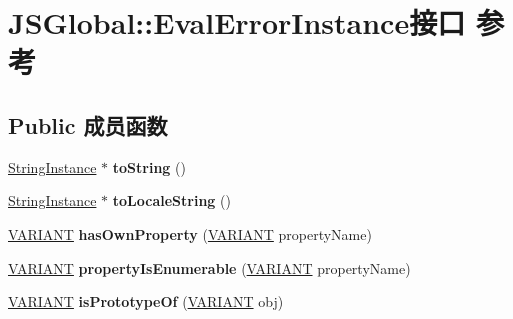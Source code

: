 \hypertarget{interface_j_s_global_1_1_eval_error_instance}{}\section{J\+S\+Global\+:\+:Eval\+Error\+Instance接口 参考}
\label{interface_j_s_global_1_1_eval_error_instance}
\subsection*{Public 成员函数}
\begin{DoxyCompactItemize}
\item 
\mbox{\label{interface_j_s_global_1_1_eval_error_instance_aa7875a9689d15f78c64ca5be8d114e8b}} 
\hyperlink{interface_j_s_global_1_1_string_instance}{String\+Instance} $\ast$ {\bfseries to\+String} ()
\item 
\mbox{\label{interface_j_s_global_1_1_eval_error_instance_ac48dba2354d92e16c06572089fcdeaf0}} 
\hyperlink{interface_j_s_global_1_1_string_instance}{String\+Instance} $\ast$ {\bfseries to\+Locale\+String} ()
\item 
\mbox{\label{interface_j_s_global_1_1_eval_error_instance_ad5681e088c045fc4a9699d256eded374}} 
\hyperlink{structtag_v_a_r_i_a_n_t}{V\+A\+R\+I\+A\+NT} {\bfseries has\+Own\+Property} (\hyperlink{structtag_v_a_r_i_a_n_t}{V\+A\+R\+I\+A\+NT} property\+Name)
\item 
\mbox{\label{interface_j_s_global_1_1_eval_error_instance_a0932f33609528a45f8633ed6a7a45dfc}} 
\hyperlink{structtag_v_a_r_i_a_n_t}{V\+A\+R\+I\+A\+NT} {\bfseries property\+Is\+Enumerable} (\hyperlink{structtag_v_a_r_i_a_n_t}{V\+A\+R\+I\+A\+NT} property\+Name)
\item 
\mbox{\label{interface_j_s_global_1_1_eval_error_instance_a08a9dd796107b349d18c02e188626a70}} 
\hyperlink{structtag_v_a_r_i_a_n_t}{V\+A\+R\+I\+A\+NT} {\bfseries is\+Prototype\+Of} (\hyperlink{structtag_v_a_r_i_a_n_t}{V\+A\+R\+I\+A\+NT} obj)
\end{DoxyCompactItemize}
